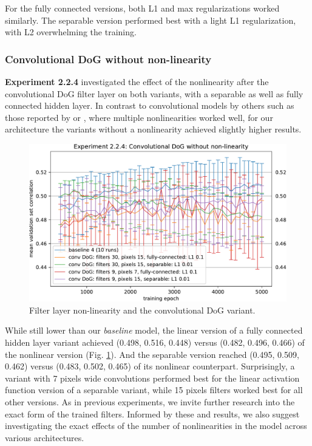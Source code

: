 For the fully connected versions, both L1 and max regularizations worked similarly. The separable version performed best with a light L1 regularization, with L2 overwhelming the training.

\subsubsection{Convolutional DoG without non-linearity}\label{ex:2.2.4}

\textbf{Experiment 2.2.4} investigated the effect of the nonlinearity after the convolutional DoG filter layer on both variants, with a separable as well as fully connected hidden layer. In contrast to convolutional models by others such as those reported by \cite{klindt} or \cite{ecker}, where multiple nonlinearities worked well, for our architecture the variants without a nonlinearity achieved slightly higher results.

\begin{figure}[H]
    \centering
    \includegraphics[width=1\textwidth]{../figures/05_2_2_4}
    \caption[Experiment 2.2.4]{Filter layer non-linearity and the convolutional DoG variant.}
    \label{fig:5.2.2.4}
\end{figure}

While still lower than our \textit{baseline} model, the linear version of a fully connected hidden layer variant achieved (0.498, 0.516, 0.448) versus (0.482, 0.496, 0.466) of the nonlinear version (Fig. \ref{fig:5.2.2.4}). And the separable version reached (0.495, 0.509, 0.462) versus (0.483, 0.502, 0.465) of its nonlinear counterpart. Surprisingly, a variant with 7 pixels wide convolutions performed best for the linear activation function version of a separable variant, while 15 pixels filters worked best for all other versions. As in previous experiments, we invite further research into the exact form of the trained filters. Informed by these and  results, we also suggest investigating the exact effects of the number of nonlinearities in the model across various architectures.

